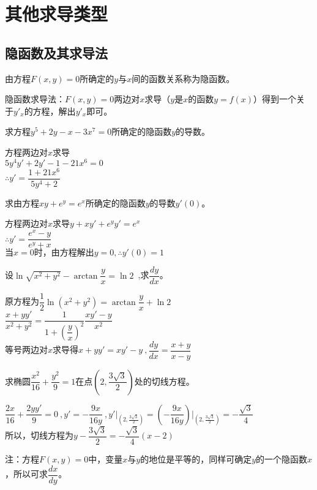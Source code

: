 \section{其他求导类型}
\subsection{隐函数及其求导法}
由方程$F\left(x,y\right)=0$所确定的$y$与$x$间的函数关系称为隐函数。\par
{\kaishu\color{blue} 隐函数求导法：$F\left(x,y\right)=0$两边对$x$求导（$y$是$x$的函数$y=f(x)$）得到一个关于$y'_x$的方程，解出$y'_x$即可。}
\begin{example}
求方程$y^5+2y-x-3x^7=0$所确定的隐函数$y$的导数。
\end{example}
\begin{solution}
方程两边对$x$求导\\
$5y^4y'+2y'-1-21x^6=0$\\
$\therefore y'=\dfrac{1+21x^6}{5y^4+2}$
\end{solution}
\begin{example}
求由方程$xy+e^y=e^x$所确定的隐函数$y$的导数$y'(0)$。
\end{example}
\begin{solution}
方程两边对$x$求导$y+xy'+e^yy'=e^x$\\
$\therefore y'=\dfrac{e^x-y}{e^y+x}$\\
$\text{当}x=0\text{时，由方程解出}y=0,\therefore y'(0)=1$
\end{solution}
\begin{example}
设$\ln \sqrt{x^2+y^2}-\arctan \dfrac{y}{x}=\ln 2$~,求$\dfrac{dy}{dx}$。
\end{example}
\begin{solution}
原方程为$\dfrac{1}{2} \ln \left(x^2+y^2\right)=\arctan \dfrac{y}{x}+\ln 2$\\
$\dfrac{x+yy'}{x^2+y^2}=\dfrac{1}{1+\left(\dfrac{y}{x}\right)^2}\dfrac{xy'-y}{x^2}$\\
等号两边对$x$求导得$x+yy'=xy'-y~,\dfrac{dy}{dx}=\dfrac{x+y}{x-y}$
\end{solution}
\begin{example}
求椭圆$\dfrac{x^2}{16}+\dfrac{y^2}{9}=1$在点$\left(2,\dfrac{3\sqrt{3}}{2}\right)$处的切线方程。
\end{example}
\begin{solution}
$\dfrac{2x}{16}+\dfrac{2yy'}{9}=0~,y'=-\dfrac{9x}{16y}~,y'\big|_{\left(2,\tfrac{3\sqrt{3}}{2}\right)}=\left(-\dfrac{9x}{16y}\right)\big|_{\left(2,\tfrac{3\sqrt{3}}{2}\right)}=-\dfrac{\sqrt{3}}{4}$\\
所以，切线方程为$y-\dfrac{3\sqrt{3}}{2}=-\dfrac{\sqrt{3}}{4}\left(x-2\right)$\\
\end{solution}
{\kaishu\color{blue} 注：方程$F\left(x,y\right)=0$中，变量$x$与$y$的地位是平等的，同样可确定$y$的一个隐函数$x$，所以可求$\dfrac{dx}{dy}$。}
